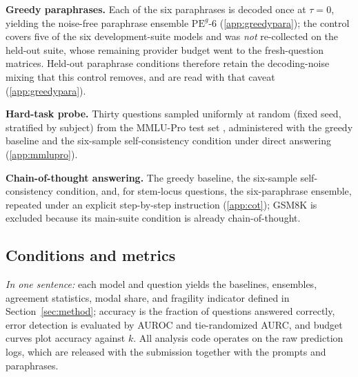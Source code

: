 \textbf{Greedy paraphrases.} Each of the six paraphrases is decoded once at $\tau = 0$, yielding the noise-free paraphrase ensemble $\mathrm{PE}^{g}\text{-}6$ (\ref{app:greedypara}); the control covers five of the six development-suite models and was \emph{not} re-collected on the held-out suite, whose remaining provider budget went to the fresh-question matrices. Held-out paraphrase conditions therefore retain the decoding-noise mixing that this control removes, and are read with that caveat (\ref{app:greedypara}).

\textbf{Hard-task probe.} Thirty questions sampled uniformly at random (fixed seed, stratified by subject) from the MMLU-Pro test set \citep{wang2024mmlupro}, administered with the greedy baseline and the six-sample self-consistency condition under direct answering (\ref{app:mmlupro}).

\textbf{Chain-of-thought answering.} The greedy baseline, the six-sample self-consistency condition, and, for stem-locus questions, the six-paraphrase ensemble, repeated under an explicit step-by-step instruction (\ref{app:cot}); GSM8K is excluded because its main-suite condition is already chain-of-thought.

\subsection{Conditions and metrics}

\emph{In one sentence:} each model and question yields the baselines, ensembles, agreement statistics, modal share, and fragility indicator defined in Section~\ref{sec:method}; accuracy is the fraction of questions answered correctly, error detection is evaluated by AUROC and tie-randomized AURC, and budget curves plot accuracy against $k$. All analysis code operates on the raw prediction logs, which are released with the submission together with the prompts and paraphrases.

